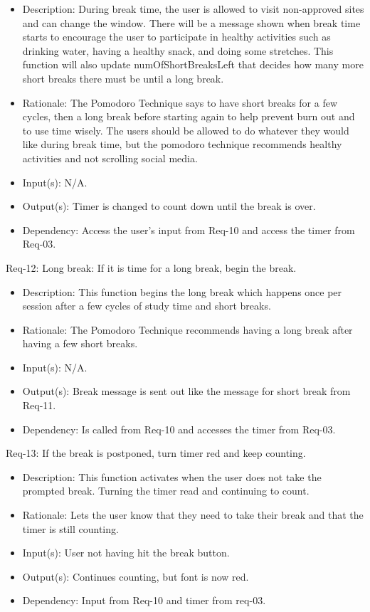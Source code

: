 \documentclass[12pt]{article}
\begin{document}
\begin{itemize}
    \item Description: During break time, the user is allowed to visit non-approved sites and can change the window. There will be a message shown when break time starts to encourage the user to participate in healthy activities such as drinking water, having a healthy snack, and doing some stretches.  This function will also update numOfShortBreaksLeft that decides how many more short breaks there must be until a long break.
    \item Rationale: The Pomodoro Technique says to have short breaks for a few cycles, then a long break before starting again to help prevent burn out and to use time wisely. The users should be allowed to do whatever they would like during break time, but the pomodoro technique recommends healthy activities and not scrolling social media.
    \item Input(s): N/A.
    \item Output(s): Timer is changed to count down until the break is over.
    \item Dependency: Access the user’s input from Req-10 and access the timer from Req-03.
\end{itemize}
Req-12: Long break: If it is time for a long break, begin the break.
\begin{itemize}
    \item Description: This function begins the long break which happens once per session after a few cycles of study time and short breaks.
    \item Rationale: The Pomodoro Technique recommends having a long break after having a few short breaks.
    \item Input(s): N/A.
    \item Output(s): Break message is sent out like the message for short break from Req-11.
    \item Dependency: Is called from Req-10 and accesses the timer from Req-03.
\end{itemize}
Req-13: If the break is postponed, turn timer red and keep counting.
\begin{itemize}
    \item Description: This function activates when the user does not take the prompted break. Turning the timer read and continuing to count.
    \item Rationale: Lets the user know that they need to take their break and that the timer is still counting.
    \item Input(s): User not having hit the break button.
    \item Output(s): Continues counting, but font is now red.
    \item Dependency: Input from Req-10 and timer from req-03.
\end{itemize}
\end{document}
